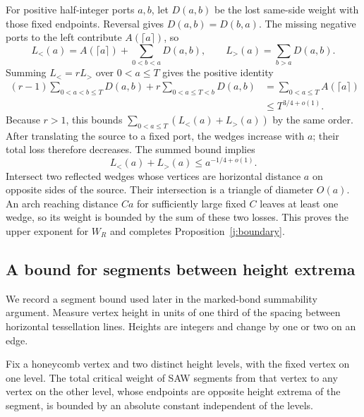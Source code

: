 For positive half-integer ports $a,b$, let $D(a,b)$ be the lost
same-side weight with those fixed endpoints. Reversal gives
$D(a,b)=D(b,a)$. The missing negative ports to the left contribute
$A(\lceil a\rceil)$, so
\[
 L_<(a)=A(\lceil a\rceil)+\sum_{0<b<a}D(a,b),
 \qquad
 L_>(a)=\sum_{b>a}D(a,b).
\]
Summing $L_<=rL_>$ over $0<a\le T$ gives the positive identity
\[
 \begin{aligned}
 (r-1)\sum_{0<a<b\le T}D(a,b)
 +r\sum_{0<a\le T<b}D(a,b)
 &=\sum_{0<a\le T}A(\lceil a\rceil)\\
 &\le T^{3/4+o(1)}.
 \end{aligned}
\]
Because $r>1$, this bounds
$\sum_{0<a\le T}(L_<(a)+L_>(a))$ by the same order. After translating
the source to a fixed port, the wedges increase with $a$; their total
loss therefore decreases. The summed bound implies
\[
 L_<(a)+L_>(a)\le a^{-1/4+o(1)}.
\]
Intersect two reflected wedges whose vertices are horizontal distance
$a$ on opposite sides of the source. Their intersection is a triangle
of diameter $O(a)$. An arch reaching distance $Ca$ for sufficiently
large fixed $C$ leaves at least one wedge, so its weight is bounded by
the sum of these two losses. This proves the upper exponent for $W_R$
and completes Proposition~\ref{j:boundary}.

\subsection{A bound for segments between height extrema}

We record a segment bound used later in the marked-bond summability
argument. Measure vertex height in units of one third of the spacing
between horizontal tessellation lines. Heights are integers and change
by one or two on an edge.

\begin{lemma}\label{j:extremal-segment}
Fix a honeycomb vertex and two distinct height levels, with the fixed
vertex on one level. The total critical weight of SAW segments from
that vertex to any vertex on the other level, whose endpoints are
opposite height extrema of the segment, is bounded by an absolute
constant independent of the levels.
\end{lemma}

